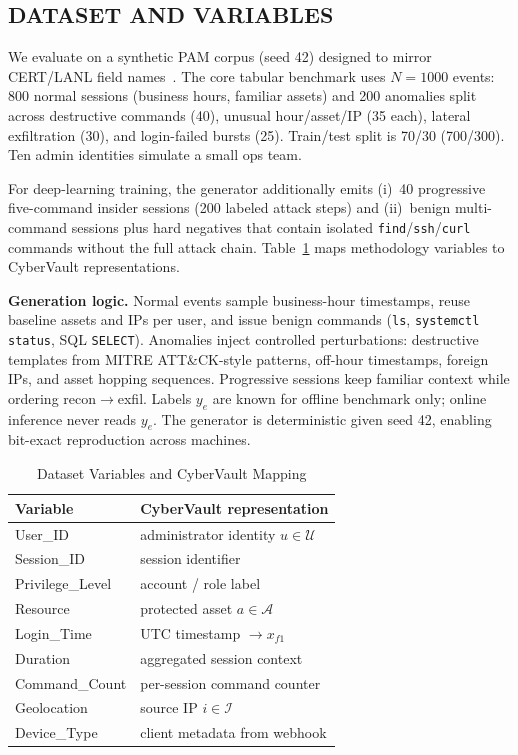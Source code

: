 \documentclass{ieeeaccess}
\begin{document}
\subsection{DATASET AND VARIABLES}
We evaluate on a synthetic PAM corpus (seed 42) designed to mirror CERT/LANL field names~\cite{ref10}. The core tabular benchmark uses $N=1000$ events: 800 normal sessions (business hours, familiar assets) and 200 anomalies split across destructive commands (40), unusual hour/asset/IP (35 each), lateral exfiltration (30), and login-failed bursts (25). Train/test split is 70/30 (700/300). Ten admin identities simulate a small ops team.

For deep-learning training, the generator additionally emits (i)~40 progressive five-command insider sessions (200 labeled attack steps) and (ii)~benign multi-command sessions plus hard negatives that contain isolated \texttt{find}/\texttt{ssh}/\texttt{curl} commands without the full attack chain. Table~\ref{tab:variables} maps methodology variables to CyberVault representations.

\textbf{Generation logic.} Normal events sample business-hour timestamps, reuse baseline assets and IPs per user, and issue benign commands (\texttt{ls}, \texttt{systemctl status}, SQL \texttt{SELECT}). Anomalies inject controlled perturbations: destructive templates from MITRE ATT\&CK-style patterns, off-hour timestamps, foreign IPs, and asset hopping sequences. Progressive sessions keep familiar context while ordering recon$\rightarrow$exfil. Labels $y_e$ are known for offline benchmark only; online inference never reads $y_e$. The generator is deterministic given seed 42, enabling bit-exact reproduction across machines.

\begin{table}[!t]
\caption{Dataset Variables and CyberVault Mapping}
\label{tab:variables}
\centering
\small
\begin{tabular}{ll}
\toprule
\textbf{Variable} & \textbf{CyberVault representation} \\
\midrule
User\_ID & administrator identity $u\in\mathcal{U}$ \\
Session\_ID & session identifier \\
Privilege\_Level & account / role label \\
Resource & protected asset $a\in\mathcal{A}$ \\
Login\_Time & UTC timestamp $\rightarrow x_{f1}$ \\
Duration & aggregated session context \\
Command\_Count & per-session command counter \\
Geolocation & source IP $i\in\mathcal{I}$ \\
Device\_Type & client metadata from webhook \\
\bottomrule
\end{tabular}
\end{table}
\end{document}
